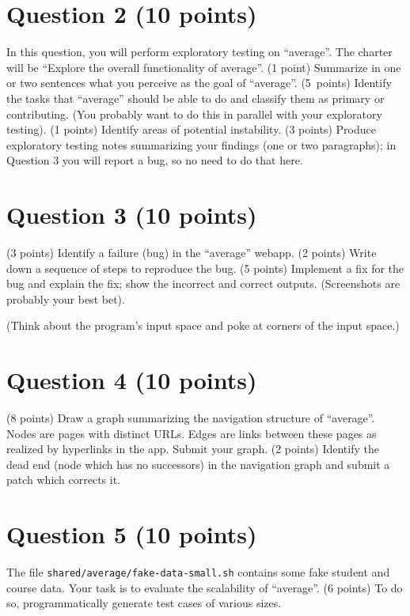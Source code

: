 \documentclass[10pt,hidelinks]{article}
\begin{document}
\section*{Question 2 (10 points)}
In this question, you will perform exploratory testing on ``average''.
The charter will be ``Explore the overall functionality of
average''. (1 point) Summarize in one or two sentences what you
perceive as the goal of ``average''. (5~points) Identify the tasks
that ``average'' should be able to do and classify them as primary or
contributing. (You probably want to do this in parallel with your
exploratory testing). (1 points) Identify areas of potential
instability. (3 points) Produce exploratory testing notes summarizing
your findings (one or two paragraphs); in Question 3 you will report a
bug, so no need to do that here.

\section*{Question 3 (10 points)}
(3 points) Identify a failure (bug) in the ``average'' webapp. (2 points) Write down a sequence of
steps to reproduce the bug. (5 points) Implement a fix for the bug and explain the
fix; show the incorrect and correct outputs. (Screenshots are probably
your best bet).

(Think about the program's input space and poke at corners of the
input space.)

\section*{Question 4 (10 points)}
(8 points) Draw a graph summarizing the navigation structure of ``average''.
Nodes are pages with distinct URLs. Edges are links between these
pages as realized by hyperlinks in the app. Submit your graph.
(2 points) Identify the dead end (node which has no successors) in the navigation
graph and submit a patch which corrects it.

\section*{Question 5 (10 points)}
The file {\tt shared/average/fake-data-small.sh}
contains some fake student and course
data.  Your task is to evaluate the scalability of ``average''. (6 points) To do
so, programmatically generate test cases of various sizes. 
\end{document}
